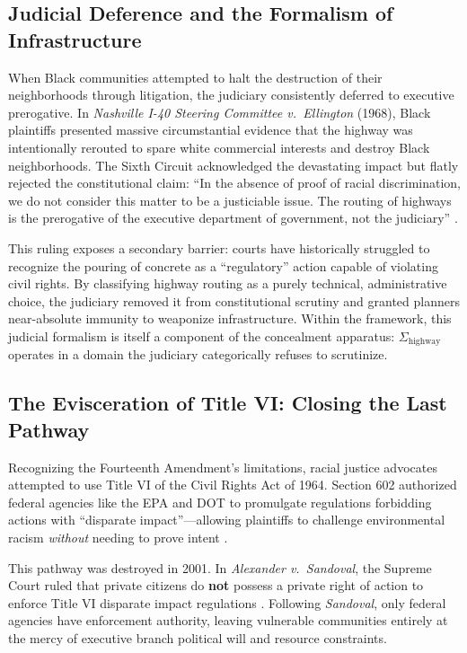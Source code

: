 \subsection{Judicial Deference and the Formalism of Infrastructure}

When Black communities attempted to halt the destruction of their neighborhoods through litigation, the judiciary consistently deferred to executive prerogative. In \textit{Nashville I-40 Steering Committee v.\ Ellington} (1968), Black plaintiffs presented massive circumstantial evidence that the highway was intentionally rerouted to spare white commercial interests and destroy Black neighborhoods. The Sixth Circuit acknowledged the devastating impact but flatly rejected the constitutional claim: ``In the absence of proof of racial discrimination, we do not consider this matter to be a justiciable issue. The routing of highways is the prerogative of the executive department of government, not the judiciary'' \cite{tel_nashville_case}.

This ruling exposes a secondary barrier: courts have historically struggled to recognize the pouring of concrete as a ``regulatory'' action capable of violating civil rights. By classifying highway routing as a purely technical, administrative choice, the judiciary removed it from constitutional scrutiny and granted planners near-absolute immunity to weaponize infrastructure. Within the framework, this judicial formalism is itself a component of the concealment apparatus: $\Sigma_{\text{highway}}$ operates in a domain the judiciary categorically refuses to scrutinize.

\subsection{The Evisceration of Title VI: Closing the Last Pathway}

Recognizing the Fourteenth Amendment's limitations, racial justice advocates attempted to use Title VI of the Civil Rights Act of 1964. Section 602 authorized federal agencies like the EPA and DOT to promulgate regulations forbidding actions with ``disparate impact''---allowing plaintiffs to challenge environmental racism \textit{without} needing to prove intent \cite{tel_title_vi}.

This pathway was destroyed in 2001. In \textit{Alexander v.\ Sandoval}, the Supreme Court ruled that private citizens do \textbf{not} possess a private right of action to enforce Title VI disparate impact regulations \cite{tel_sandoval}. Following \textit{Sandoval}, only federal agencies have enforcement authority, leaving vulnerable communities entirely at the mercy of executive branch political will and resource constraints.

